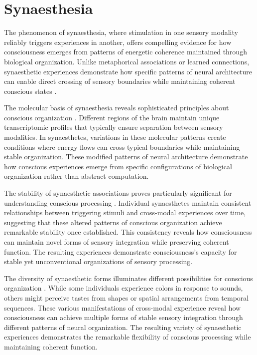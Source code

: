 \section{Synaesthesia}

The phenomenon of synaesthesia, where stimulation in one sensory modality reliably triggers experiences in another, offers compelling evidence for how consciousness emerges from patterns of energetic coherence maintained through biological organization. Unlike metaphorical associations or learned connections, synaesthetic experiences demonstrate how specific patterns of neural architecture can enable direct crossing of sensory boundaries while maintaining coherent conscious states \cite{Ramachandran2001}.

The molecular basis of synaesthesia reveals sophisticated principles about conscious organization \cite{Hubbard2005}. Different regions of the brain maintain unique transcriptomic profiles that typically ensure separation between sensory modalities. In synaesthetes, variations in these molecular patterns create conditions where energy flows can cross typical boundaries while maintaining stable organization. These modified patterns of neural architecture demonstrate how conscious experiences emerge from specific configurations of biological organization rather than abstract computation.

The stability of synaesthetic associations proves particularly significant for understanding conscious processing \cite{Dixon2004}. Individual synaesthetes maintain consistent relationships between triggering stimuli and cross-modal experiences over time, suggesting that these altered patterns of conscious organization achieve remarkable stability once established. This consistency reveals how consciousness can maintain novel forms of sensory integration while preserving coherent function. The resulting experiences demonstrate consciousness's capacity for stable yet unconventional organizations of sensory processing.

The diversity of synaesthetic forms illuminates different possibilities for conscious organization \cite{Ward2013}. While some individuals experience colors in response to sounds, others might perceive tastes from shapes or spatial arrangements from temporal sequences. These various manifestations of cross-modal experience reveal how consciousness can achieve multiple forms of stable sensory integration through different patterns of neural organization. The resulting variety of synaesthetic experiences demonstrates the remarkable flexibility of conscious processing while maintaining coherent function.


